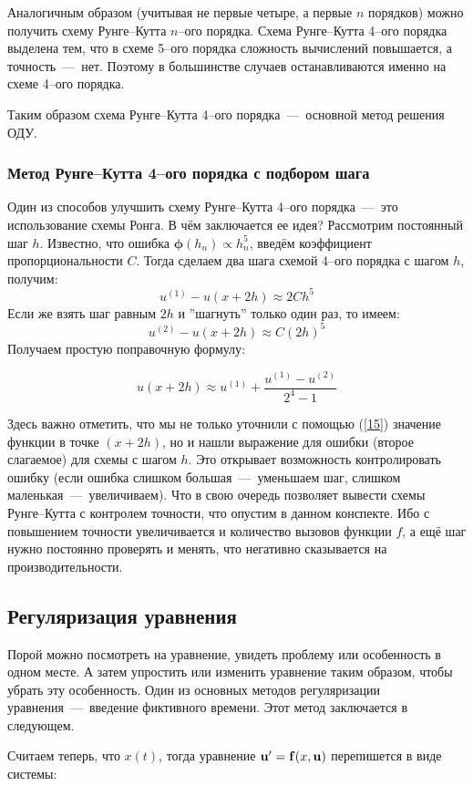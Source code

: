 \documentclass[a4paper,9pt,russian]{article}
\begin{document}
    Аналогичным образом (учитывая не первые четыре, а первые $n$ порядков) можно получить схему Рунге--Кутта $n$--ого порядка. Схема Рунге--Кутта 4--ого порядка выделена тем, что в схеме 5--ого порядка сложность вычислений повышается, а точность~---~нет. Поэтому в большинстве случаев останавливаются именно на схеме 4--ого порядка.\par
    Таким образом {схема Рунге--Кутта 4--ого порядка~---~основной метод решения ОДУ}.
\subsubsection{Метод Рунге--Кутта 4--ого порядка с подбором шага}
    Один из способов улучшить схему Рунге--Кутта 4--ого порядка~---~это использование схемы Ронга. В чём заключается ее идея? Рассмотрим постоянный шаг $h$. Известно, что ошибка $\boldsymbol{\phi} (h_n) \propto h_n^5$, введём коэффициент пропорциональности $C$. Тогда сделаем два шага схемой 4--ого порядка с шагом $h$, получим:
    \begin{equation}
        u^{(1)} - u(x + 2h) \approx 2Ch^5
    \end{equation}
    Если же взять шаг равным $2h$ и ''шагнуть'' только один раз, то имеем:
    \begin{equation}
        u^{(2)} - u(x + 2h) \approx C(2h)^5
    \end{equation}
    Получаем простую {поправочную формулу}:
    
    \begin{equation}\label{15}
        u(x + 2h) \approx u^{(1)} + \frac{u^{(1)}-u^{(2)}}{2^4-1}
    \end{equation}
    
    Здесь важно отметить, что мы не только уточнили с помощью (\ref{15}) значение функции в точке $(x+2h)$, но и нашли выражение для ошибки (второе слагаемое) для схемы с шагом $h$. Это открывает возможность контролировать ошибку (если ошибка слишком большая~---~уменьшаем шаг, слишком маленькая~---~увеличиваем). Что в свою очередь позволяет вывести {схемы Рунге--Кутта с контролем точности}, что опустим в данном конспекте. Ибо с повышением точности увеличивается и количество вызовов функции $f$, а ещё шаг нужно постоянно проверять и менять, что негативно сказывается на производительности.   
\subsection{Регуляризация уравнения}\label{regul}
    Порой можно посмотреть на уравнение, увидеть проблему или особенность в одном месте. А затем упростить или изменить уравнение таким образом, чтобы убрать эту особенность. Один из основных методов регуляризации уравнения~---~{введение фиктивного времени}. Этот метод заключается в следующем.\par
    Считаем теперь, что $x(t)$, тогда уравнение ${\bf u}' = {\bf f}(x, {\bf u})$ перепишется в виде системы:
    
\end{document}
